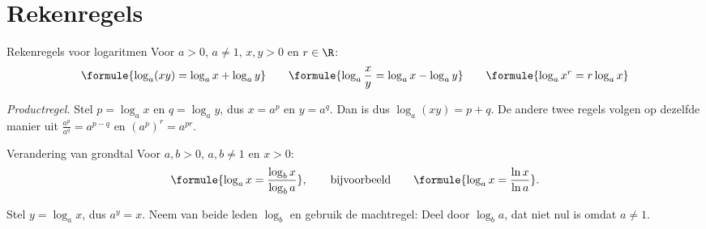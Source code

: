 

\begin{oefeningen}

\end{oefeningen}

\section{Rekenregels}

\begin{theorie}
\begin{stelling}{Rekenregels voor logaritmen}
Voor $a > 0$, $a \neq 1$, $x, y > 0$ en $r \in \R$:
\[\formule{\log_a (xy) = \log_a x + \log_a y} \qquad \formule{\log_a \frac{x}{y} = \log_a x - \log_a y} \qquad \formule{\log_a x^r = r \log_a x}\]
\end{stelling}
\begin{bewijs}
\textit{Productregel.} Stel $p = \log_a x$ en $q = \log_a y$, dus $x = a^p$ en $y = a^q$. Dan is
dus $\log_a(xy) = p + q$. De andere twee regels volgen op dezelfde manier uit $\frac{a^p}{a^q} = a^{p - q}$ en $(a^p)^r = a^{pr}$.
\end{bewijs}

\begin{stelling}{Verandering van grondtal}
Voor $a, b > 0$, $a, b \neq 1$ en $x > 0$:
\[\formule{\log_a x = \frac{\log_b x}{\log_b a}}, \qquad \text{bijvoorbeeld} \qquad \formule{\log_a x = \frac{\ln x}{\ln a}}.\]
\end{stelling}
\begin{bewijs}
Stel $y = \log_a x$, dus $a^y = x$. Neem van beide leden $\log_b$ en gebruik de machtregel:
Deel door $\log_b a$, dat niet nul is omdat $a \neq 1$.
\end{bewijs}
\end{theorie}


